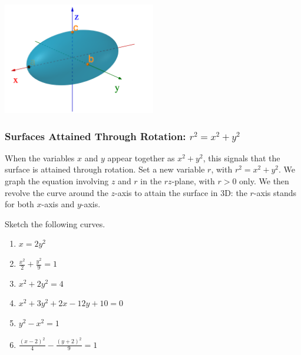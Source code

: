 \documentclass[11pt,fleqn]{book} %
\begin{document}
\begin{center} \includegraphics[width=0.5\textwidth]{Plots/ellipsoid.png} \end{center}

\subsubsection*{Surfaces Attained Through Rotation: $r^2 = x^2 + y^2$}

When the variables $x$ and $y$ appear together as $x^2 + y^2$, this signals that the surface is attained through rotation. Set a new variable $r$, with $r^2 = x^2 + y^2$. We graph the equation involving $z$ and $r$ in the $rz$-plane, with $r > 0$ only. We then revolve the curve around the $z$-axis to attain the surface in 3D: the $r$-axis stands for both $x$-axis and $y$-axis.

\begin{exercise}
    Sketch the following curves.

    \begin{minipage}[t]{0.45\linewidth} 
        \begin{enumerate}
            \item $x = 2y^2$
            \item $\frac{x^2}{2} + \frac{y^2}{9} = 1$
            \item $x^2 + 2y^2 = 4$
        \end{enumerate}
    \end{minipage}
    \begin{minipage}[t]{0.45\linewidth} 
        \begin{enumerate} \setcounter{enumi}{3}
            \item $x^2 + 3y^2 + 2x - 12y + 10 = 0$
            \item $y^2 - x^2 = 1$
            \item $\frac{(x - 2)^2}{4} - \frac{(y + 2)^2}{9} = 1$
        \end{enumerate}
    \end{minipage}
\end{exercise}
\end{document}
